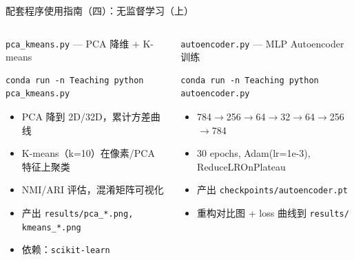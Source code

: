\documentclass[aspectratio=169]{ctexbeamer}
\begin{document}
\begin{frame}[fragile,shrink=15]{配套程序使用指南（四）：无监督学习（上）}
\small

\begin{columns}[T]
\begin{block}{\texttt{pca\_kmeans.py} — PCA 降维 + K-means}
\begin{lstlisting}[basicstyle=\ttfamily\scriptsize, frame=none, numbers=none, backgroundcolor=\color{codebg}]
conda run -n Teaching python pca_kmeans.py
\end{lstlisting}
\vspace{-0.35cm}
\begin{itemize}
  \item PCA 降到 2D/32D，累计方差曲线
  \item K-means（k=10）在像素/PCA 特征上聚类
  \item NMI/ARI 评估，混淆矩阵可视化
  \item 产出 \texttt{results/pca\_*.png, kmeans\_*.png}
  \item 依赖：\texttt{scikit-learn}
\end{itemize}
\end{block}

\vspace{0.05cm}

\begin{block}{\texttt{autoencoder.py} — MLP Autoencoder 训练}
\begin{lstlisting}[basicstyle=\ttfamily\scriptsize, frame=none, numbers=none, backgroundcolor=\color{codebg}]
conda run -n Teaching python autoencoder.py
\end{lstlisting}
\vspace{-0.35cm}
\begin{itemize}
  \item 784$\to$256$\to$64$\to$32$\to$64$\to$256$\to$784
  \item 30 epochs, Adam(lr=1e-3), ReduceLROnPlateau
  \item 产出 \texttt{checkpoints/autoencoder.pt}
  \item 重构对比图 + loss 曲线到 \texttt{results/}
\end{itemize}
\end{block}


\end{columns}
\end{frame}
\end{document}
